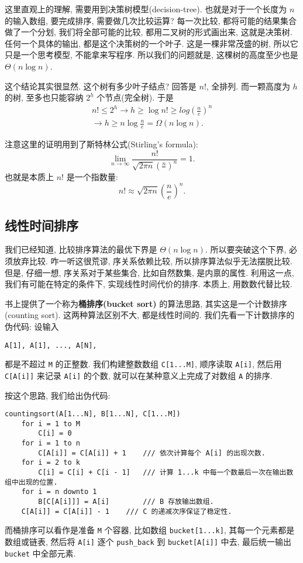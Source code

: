 \documentclass[a4paper]{ctexart}
\theoremstyle{definition}
\theoremstyle{definition}
\begin{document}
这里直观上的理解, 需要用到决策树模型(decision-tree).
也就是对于一个长度为 $n$ 的输入数组, 要完成排序, 需要做几次比较运算?
每一次比较, 都将可能的结果集合做了一个分划, 我们将全部可能的比较,
都用二叉树的形式画出来, 这就是决策树. 任何一个具体的输出, 都是这个决策树的一个叶子.
这是一棵非常茂盛的树, 所以它只是一个思考模型, 不能拿来写程序.
所以我们的问题就是, 这棵树的高度至少也是 $\Theta(n \log n)$.

这个结论其实很显然. 这个树有多少叶子结点? 回答是 $n!$, 全排列.
而一颗高度为 $h$ 的树, 至多也只能容纳 $2^h$ 个节点(完全树).
于是
$$
\begin{array}{r}
n! \leq 2^h \rightarrow h \geq \log n! \geq
log\left(\frac{n}{e}\right)^n \\ \rightarrow h \geq n \log \frac{n}{e}
= \Omega(n\log n).
\end{array}
$$

注意这里的证明用到了斯特林公式(Stirling's formula):
$$
\lim_{n \to \infty} \frac{n!}{\sqrt{2 \pi n}
  \left(\frac{n}{}\right)^n} = 1.
$$
也就是本质上 $n!$ 是一个指数量:
$$
n! \approx \sqrt{2 \pi n}\left(\frac{n}{e}\right)^n.
$$


\subsection{线性时间排序}

我们已经知道, 比较排序算法的最优下界是 $\Theta(n \log n)$.
所以要突破这个下界, 必须放弃比较. 咋一听这很荒谬, 序关系依赖比较,
所以排序算法似乎无法摆脱比较. 但是, 仔细一想, 序关系对于某些集合, 比如自然数集,
是内禀的属性. 利用这一点, 我们有可能在特定的条件下, 实现线性时间代价的排序.
本质上, 用数数代替比较. 

书上提供了一个称为{\bf 桶排序(bucket sort)} 的算法思路,
其实这是一个计数排序(counting sort). 这两种算法区别不大, 都是线性时间的.
我们先看一下计数排序的伪代码: 设输入
\begin{verbatim}
A[1], A[1], ..., A[N],
\end{verbatim}
都是不超过 \verb|M| 的正整数. 我们构建整数数组 \verb|C[1...M]|,
顺序读取 \verb|A[i]|, 然后用 \verb|C[A[i]]| 来记录 \verb|A[i]| 的个数,
就可以在某种意义上完成了对数组 \verb|A| 的排序.

按这个思路, 我们给出伪代码:

\begin{verbatim}
countingsort(A[1...N], B[1...N], C[1...M])
    for i = 1 to M
        C[i] = 0
    for i = 1 to n
        C[A[i]] = C[A[i]] + 1    /// 依次计算每个 A[i] 的出现次数.
    for i = 2 to k
        C[i] = C[i] + C[i - 1]   /// 计算 1...k 中每一个数最后一次在输出数组中出现的位置.
    for i = n downto 1
        B[C[A[i]]] = A[i]        /// B 存放输出数组.
	C[A[i]] = C[A[i]] - 1    /// C 的递减次序保证了稳定性.
\end{verbatim}
而桶排序可以看作是准备 \verb|M| 个容器, 比如数组 \verb|bucket[1...k]|,
其每一个元素都是数组或链表, 然后将 \verb|A[i]| 逐个 \verb|push_back|
到 \verb|bucket[A[i]]| 中去, 最后统一输出 \verb|bucket| 中全部元素. 
\end{document}
